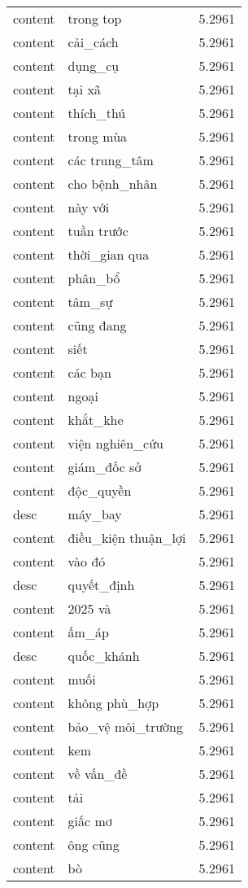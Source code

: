 \documentclass{article}
\begin{document}
\begin{tabular}{lll}
content & trong top & 5.2961\\
content & cải\_cách & 5.2961\\
content & dụng\_cụ & 5.2961\\
content & tại xã & 5.2961\\
content & thích\_thú & 5.2961\\
content & trong mùa & 5.2961\\
content & các trung\_tâm & 5.2961\\
content & cho bệnh\_nhân & 5.2961\\
content & này với & 5.2961\\
content & tuần trước & 5.2961\\
content & thời\_gian qua & 5.2961\\
content & phân\_bổ & 5.2961\\
content & tâm\_sự & 5.2961\\
content & cũng đang & 5.2961\\
content & siết & 5.2961\\
content & các bạn & 5.2961\\
content & ngoại & 5.2961\\
content & khắt\_khe & 5.2961\\
content & viện nghiên\_cứu & 5.2961\\
content & giám\_đốc sở & 5.2961\\
content & độc\_quyền & 5.2961\\
desc & máy\_bay & 5.2961\\
content & điều\_kiện thuận\_lợi & 5.2961\\
content & vào đó & 5.2961\\
desc & quyết\_định & 5.2961\\
content & 2025 và & 5.2961\\
content & ấm\_áp & 5.2961\\
desc & quốc\_khánh & 5.2961\\
content & muối & 5.2961\\
content & không phù\_hợp & 5.2961\\
content & bảo\_vệ môi\_trường & 5.2961\\
content & kem & 5.2961\\
content & về vấn\_đề & 5.2961\\
content & tải & 5.2961\\
content & giấc mơ & 5.2961\\
content & ông cũng & 5.2961\\
content & bò & 5.2961\\

\end{tabular}
\end{document}
